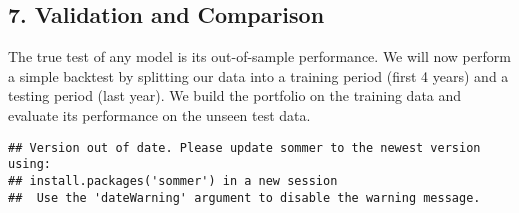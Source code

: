 \documentclass[
]{article}
\newenvironment{Shaded}{\begin{snugshade}}{\end{snugshade}}
\newcommand{\AttributeTok}[1]{\textcolor[rgb]{0.13,0.29,0.53}{#1}}
\newcommand{\CommentTok}[1]{\textcolor[rgb]{0.56,0.35,0.01}{\textit{#1}}}
\newcommand{\ConstantTok}[1]{\textcolor[rgb]{0.56,0.35,0.01}{#1}}
\newcommand{\DecValTok}[1]{\textcolor[rgb]{0.00,0.00,0.81}{#1}}
\newcommand{\FunctionTok}[1]{\textcolor[rgb]{0.13,0.29,0.53}{\textbf{#1}}}
\newcommand{\NormalTok}[1]{#1}
\newcommand{\OtherTok}[1]{\textcolor[rgb]{0.56,0.35,0.01}{#1}}
\newcommand{\SpecialCharTok}[1]{\textcolor[rgb]{0.81,0.36,0.00}{\textbf{#1}}}
\begin{document}
\subsection{7. Validation and Comparison}\label{validation}

The true test of any model is its out-of-sample performance. We will now
perform a simple backtest by splitting our data into a training period
(first 4 years) and a testing period (last year). We build the portfolio
on the training data and evaluate its performance on the unseen test
data.

\begin{Shaded}
\end{Shaded}

\begin{verbatim}
## Version out of date. Please update sommer to the newest version using:
## install.packages('sommer') in a new session
##  Use the 'dateWarning' argument to disable the warning message.
\end{verbatim}
\end{document}
